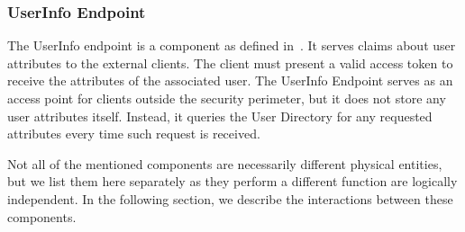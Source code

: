 \subsubsection{UserInfo Endpoint}
The UserInfo endpoint is a component as defined in~\cite{Sakimura2014Final:1}. It serves claims about user attributes to the external clients. The client must present a valid access token to receive the attributes of the associated user. The UserInfo Endpoint serves as an access point for clients outside the security perimeter, but it does not store any user attributes itself. Instead, it queries the User Directory for any requested attributes every time such request is received.

\bigskip \noindent
Not all of the mentioned components are necessarily different physical entities, but we list them here separately as they perform a different function are logically independent. In the following section, we describe the interactions between these components.